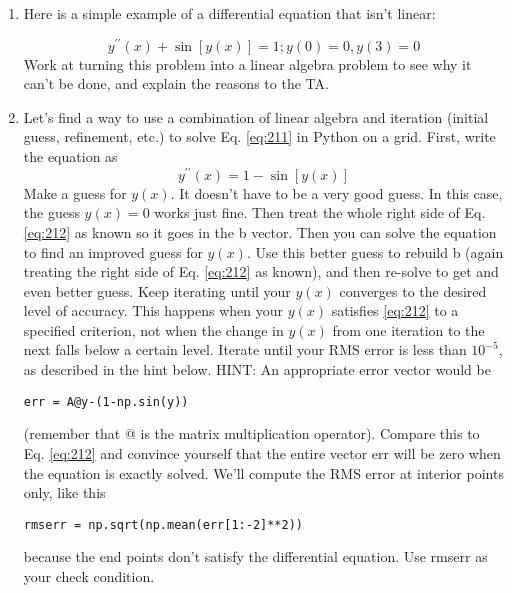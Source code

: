 	\begin{problem} \label{P2.5}
\begin{enumerate}[label=(\alph*)]
\item Here is a simple example of a differential equation that isn\rq t linear:

	\begin{equation}\label{eq:211}
		y^{\prime\prime}(x) + \sin[y(x)] = 1 ; y(0) = 0, y(3) = 0
	\end{equation}
		Work at turning this problem into a linear algebra problem to see why
it can\rq t be done, and explain the reasons to the TA.
\item Let\rq s find a way to use a combination of linear algebra and iteration
(initial guess, refinement, etc.) to solve Eq. \ref{eq:211} in Python on a grid.
First, write the equation as
\begin{equation}\label{eq:212}
		y^{\prime\prime}(x)= 1 - \sin[y(x)]
	\end{equation}
	Make a guess for $y(x)$. It doesn\rq t have to be a very good guess. In this
case, the guess $y(x) = 0$ works just fine. Then treat the whole right side
of Eq.\ref{eq:212} as known so it goes in the b vector. Then you can solve the equation to find an improved guess for
$y(x)$. Use this better guess to rebuild b (again treating the right side of Eq. \ref{eq:212} as known), and
then re-solve to get and even better guess. Keep iterating until your $y(x)$ converges to the desired level of accuracy. This happens when your $y(x)$  satisfies \ref{eq:212}  to a specified criterion, not when the change
in $y(x)$ from one iteration to the next falls below a certain level. Iterate until your RMS error is less than $10^{-5}$, as described in the hint below.
HINT: An appropriate error vector would be
\begin{lstlisting}
err = A@y-(1-np.sin(y))
\end{lstlisting}
(remember that @ is the matrix multiplication operator). Compare
this to Eq. \ref{eq:212}
 and convince yourself that the entire vector err will
be zero when the equation is exactly solved. We\rq ll compute the RMS
error at interior points only, like this
\begin{lstlisting}
rmserr = np.sqrt(np.mean(err[1:-2]**2))
\end{lstlisting}
because the end points don\rq t satisfy the differential equation. Use rmserr as your check condition.
\end{enumerate}
\end{problem}
